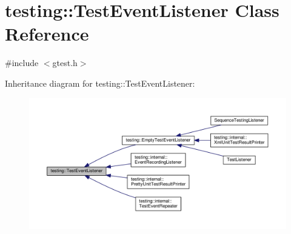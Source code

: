 \hypertarget{classtesting_1_1TestEventListener}{}\section{testing\+:\+:Test\+Event\+Listener Class Reference}
\label{classtesting_1_1TestEventListener}


{\ttfamily \#include $<$gtest.\+h$>$}



Inheritance diagram for testing\+:\+:Test\+Event\+Listener\+:
\nopagebreak
\begin{figure}[H]
\begin{center}
\leavevmode
\includegraphics[width=350pt]{classtesting_1_1TestEventListener__inherit__graph}
\end{center}
\end{figure}
